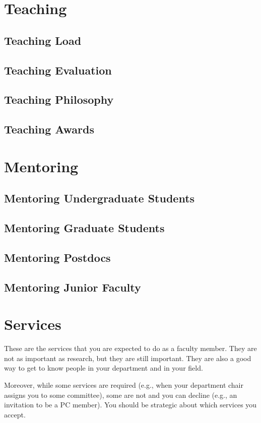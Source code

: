 \documentclass[oneside,11pt]{memoir}
\begin{document}
\chapter{Teaching}
\section{Teaching Load}
\section{Teaching Evaluation}
\section{Teaching Philosophy}
\section{Teaching Awards}



\chapter{Mentoring}
\section{Mentoring Undergraduate Students}
\section{Mentoring Graduate Students}
\section{Mentoring Postdocs}
\section{Mentoring Junior Faculty}

\chapter{Services}
These are the services that you are expected to do as a faculty member.  They are not as important as research, but they are still important.  They are also a good way to get to know people in your department and in your field.

Moreover, while some services are required (e.g., when your department chair assigns you to some committee), some are not and you can decline (e.g., an invitation to be a PC member).  You should be strategic about which services you accept.
\end{document}
